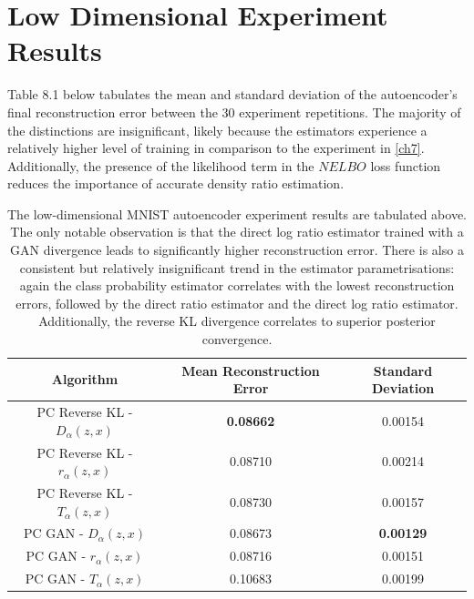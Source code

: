 \documentclass[honours,12pt]{unswthesis}
\numberwithin{equation}{section}
\theoremstyle{definition}
\begin{document}
\section{Low Dimensional Experiment Results}
Table 8.1 below tabulates the mean and standard deviation of the autoencoder's final reconstruction error between the 30 experiment repetitions. The majority of the distinctions are insignificant, likely because the estimators experience a relatively higher level of training in comparison to the experiment in \autoref{ch7}. Additionally, the presence of the likelihood term in the $NELBO$ loss function reduces the importance of accurate density ratio estimation.
\begin{table}[h]
\centering
\begin{tabular}{|c|c|c|}
\hline
Algorithm & Mean Reconstruction Error & Standard Deviation\\
\hline
PC Reverse KL - $D_\alpha(z,x)$ & \textbf{0.08662} & 0.00154\\
\hline
PC Reverse KL - $r_\alpha(z,x)$ & 0.08710 & 0.00214\\
\hline
PC Reverse KL - $T_\alpha(z,x)$ & 0.08730 & 0.00157\\
\hline
PC GAN - $D_\alpha(z,x)$ & 0.08673 & \textbf{0.00129}\\
\hline
PC GAN - $r_\alpha(z,x)$ & 0.08716 & 0.00151\\
\hline
PC GAN - $T_\alpha(z,x)$ & 0.10683 & 0.00199\\
\hline
\end{tabular}
\caption{\small The low-dimensional MNIST autoencoder experiment results are tabulated above. The only notable observation is that the direct log ratio estimator trained with a GAN divergence leads to significantly higher reconstruction error. There is also a consistent but relatively insignificant trend in the estimator parametrisations: again the class probability estimator correlates with the lowest reconstruction errors, followed by the direct ratio estimator and the direct log ratio estimator. Additionally, the reverse KL divergence correlates to superior posterior convergence.}
\end{table}
\end{document}

